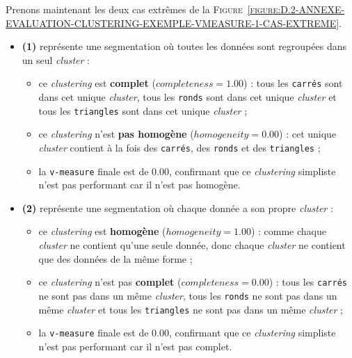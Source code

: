 		Prenons maintenant les deux cas extrêmes de la \textsc{Figure~\ref{figure:D.2-ANNEXE-EVALUATION-CLUSTERING-EXEMPLE-VMEASURE-1-CAS-EXTREME}}.
		\begin{itemize}
			\item \textbf{(1)} représente une segmentation où toutes les données sont regroupées dans un seul \textit{cluster} :
			\begin{itemize}
				\item ce \textit{clustering} est \textbf{complet} ($completeness=1.00$) : tous les \texttt{carrés} sont dans cet unique \textit{cluster}, tous les \texttt{ronds} sont dans cet unique \textit{cluster} et tous les \texttt{triangles} sont dans cet unique \textit{cluster} ;
				\item ce \textit{clustering} n'est \textbf{pas homogène} ($homogeneity=0.00$) : cet unique \textit{cluster} contient à la fois des \texttt{carrés}, des \texttt{ronds} et des \texttt{triangles} ;
				\item la \texttt{v-measure} finale est de $0.00$, confirmant que ce \textit{clustering} simpliste n'est pas performant car il n'est pas homogène.
			\end{itemize}
			\item \textbf{(2)} représente une segmentation où chaque donnée a son propre \textit{cluster} :
			\begin{itemize}
				\item ce \textit{clustering} est \textbf{homogène} ($homogeneity=1.00$) : comme chaque \textit{cluster} ne contient qu'une seule donnée, donc chaque \textit{cluster} ne contient que des données de la même forme ;
				\item ce \textit{clustering} n'est pas \textbf{complet} ($completeness=0.00$) : tous les \texttt{carrés} ne sont pas dans un même \textit{cluster}, tous les \texttt{ronds} ne sont pas dans un même \textit{cluster} et tous les \texttt{triangles} ne sont pas dans un même \textit{cluster} ;
				\item la \texttt{v-measure} finale est de $0.00$, confirmant que ce \textit{clustering} simpliste n'est pas performant car il n'est pas complet.
			\end{itemize}
		\end{itemize}
	
